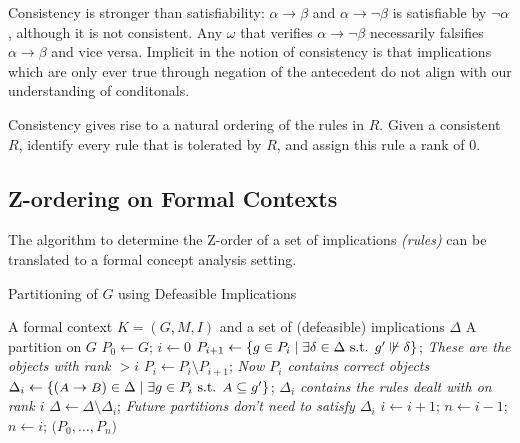 Consistency is stronger than satisfiability: $\alpha \rightarrow \beta$ and $\alpha \rightarrow \neg \beta$ is satisfiable by $\neg \alpha$, although it is not consistent. Any $\omega$ that verifies $\alpha \rightarrow \neg \beta$ necessarily falsifies $\alpha \rightarrow \beta$ and vice versa. Implicit in the notion of consistency is that implications which are only ever true through negation of the antecedent do not align with our understanding of conditonals. \cite{Pearl:1990}


Consistency gives rise to a natural ordering of the rules in $R$. Given a consistent $R$, identify every rule that is tolerated by $R$, and assign this rule a rank of $0$.


\subsection{Z-ordering on Formal Contexts}
\label{Ordering on objects}
The algorithm to determine the Z-order of a set of implications \textit{(rules)} can be translated to a formal concept analysis setting.

\begin{algorithm}
    \begin{algorithmic}[1]
        \caption{Partitioning of $G$ using Defeasible Implications}
        \Require A formal context $K = (G,M,I)$ and a set of (defeasible) implications $\Delta$
        \Ensure A partition on $G$
        \State $P_0 \gets G$;
        \State $i \gets 0$
        \State $P_{i+1} \gets \{g \in P_i \mid \exists \delta \in \Delta \text{ s.t. } g' \not \Vdash \delta \}$; \hfill \textit{These are the objects with rank $> i$}
        \State $P_i \gets P_i \setminus P_{i+1}$; \hfill \textit{Now $P_i$ contains correct objects}
        \State $\Delta_i \gets \{(\A \rightarrow \B) \in \Delta \mid \exists g \in P_i \st \A \subseteq g'\}$; \hfill \textit{$\Delta_i$ contains the rules dealt with on rank $i$}
        \State $\Delta \gets \Delta \setminus \Delta_i$; \hfill \textit{Future partitions don't need to satisfy $\Delta_i$}
        \State $i \gets i+1$;
        \EndWhile
        \State $n \gets i-1$;
        \Else
        \State $n \gets i$;
        \EndIf
        \State \Return $\big(P_0,\ldots, P_n\big)$
    \end{algorithmic}
\end{algorithm}